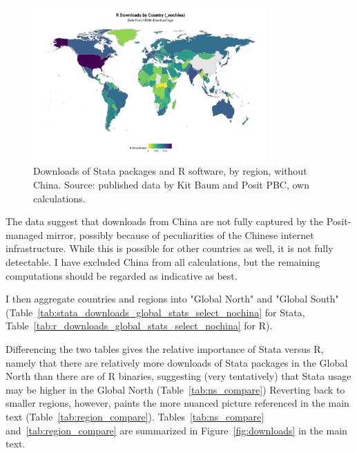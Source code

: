 \documentclass{Revue-economique}
\begin{document}
\begin{Article} [%
	Titre={Reproducibility and Open Science in Economics},
	Auteur={Lars Vilhuber\thanks{Cornell University, lars.vilhuber@cornell.edu}}]
\begin{refsection}[Main]
\begin{appendices}
\begin{figure}
	\includegraphics[width=0.8\textwidth]{outputs/r_downloads_world_map_select_nochina.png}
	\caption{Downloads of Stata packages and R software, by region, without China. Source: published data by Kit Baum and Posit PBC, own calculations.}
	\label{fig:stata_r_world}
\end{figure}
The data suggest that downloads from China are not fully captured by the Posit-managed mirror, possibly because of peculiarities of the Chinese internet infrastructure. While this is possible for other countries as well, it is not fully detectable. I have excluded China from all calculations, but the remaining computations should be regarded as indicative as best. 

I then aggregate countries and regions into "Global North" and "Global South" (Table~\ref{tab:stata_downloads_global_stats_select_nochina} for Stata, Table~\ref{tab:r_downloads_global_stats_select_nochina} for R). 
%
%


%
%
Differencing the two tables  gives the relative importance of Stata versus R, namely that there are relatively more downloads of Stata packages in the Global North than there are of R binaries, suggesting (very tentatively) that Stata usage may be higher in the Global North (Table~\ref{tab:ns_compare})
Reverting back to smaller regions, however, paints the more nuanced picture referenced in the main text (Table~\ref{tab:region_compare}). Tables~\ref{tab:ns_compare} and~\ref{tab:region_compare} are summarized in Figure~\ref{fig:downloads} in the main text.




\end{appendices}

\printbibliography %
\end{refsection}

\end{Article}


\appendix
\appendixpage
\end{document}
